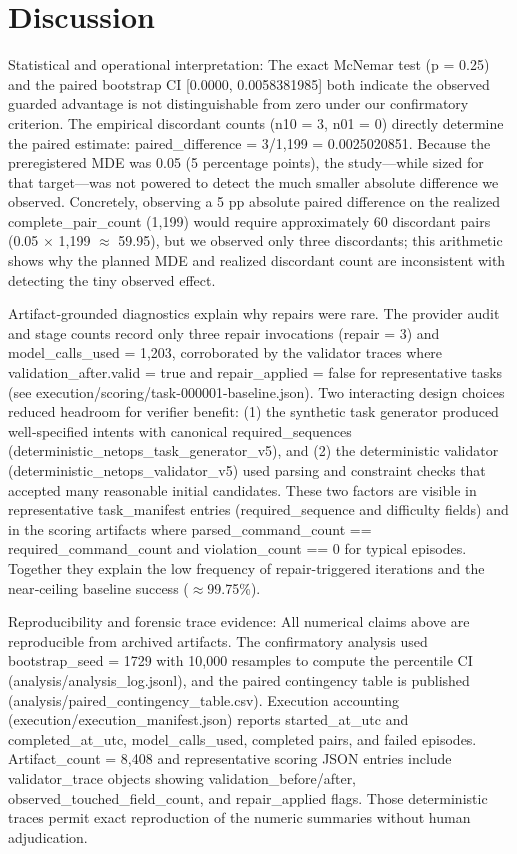 \documentclass[conference]{IEEEtran}
\begin{document}
\section{Discussion}
Statistical and operational interpretation: The exact McNemar test (p = 0.25) and the paired bootstrap CI [0.0000, 0.0058381985] both indicate the observed guarded advantage is not distinguishable from zero under our confirmatory criterion. The empirical discordant counts (n10 = 3, n01 = 0) directly determine the paired estimate: paired\_difference = 3/1,199 = 0.0025020851. Because the preregistered MDE was 0.05 (5 percentage points), the study---while sized for that target---was not powered to detect the much smaller absolute difference we observed. Concretely, observing a 5 pp absolute paired difference on the realized complete\_pair\_count (1,199) would require approximately 60 discordant pairs (0.05 \ensuremath{\times} 1,199 \ensuremath{\approx} 59.95), but we observed only three discordants; this arithmetic shows why the planned MDE and realized discordant count are inconsistent with detecting the tiny observed effect.

Artifact‑grounded diagnostics explain why repairs were rare. The provider audit and stage counts record only three repair invocations (repair = 3) and model\_calls\_used = 1,203, corroborated by the validator traces where validation\_after.valid = true and repair\_applied = false for representative tasks (see execution/scoring/task-000001-baseline.json). Two interacting design choices reduced headroom for verifier benefit: (1) the synthetic task generator produced well‑specified intents with canonical required\_sequences (deterministic\_netops\_task\_generator\_v5), and (2) the deterministic validator (deterministic\_netops\_validator\_v5) used parsing and constraint checks that accepted many reasonable initial candidates. These two factors are visible in representative task\_manifest entries (required\_sequence and difficulty fields) and in the scoring artifacts where parsed\_command\_count == required\_command\_count and violation\_count == 0 for typical episodes. Together they explain the low frequency of repair-triggered iterations and the near‑ceiling baseline success (\ensuremath{\approx}99.75\%).

Reproducibility and forensic trace evidence: All numerical claims above are reproducible from archived artifacts. The confirmatory analysis used bootstrap\_seed = 1729 with 10,000 resamples to compute the percentile CI (analysis/analysis\_log.jsonl), and the paired contingency table is published (analysis/paired\_contingency\_table.csv). Execution accounting (execution/execution\_manifest.json) reports started\_at\_utc and completed\_at\_utc, model\_calls\_used, completed pairs, and failed episodes. Artifact\_count = 8,408 and representative scoring JSON entries include validator\_trace objects showing validation\_before/after, observed\_touched\_field\_count, and repair\_applied flags. Those deterministic traces permit exact reproduction of the numeric summaries without human adjudication.
\end{document}
